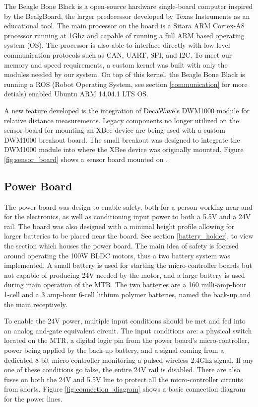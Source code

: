 The Beagle Bone Black is a open-source hardware single-board computer inspired by the BealgBoard, the larger predecessor developed by Texas Instruments as an educational tool.
The main processor on the board is a Sitara ARM Cortex-A8 processor running at 1Ghz and capable of running a full ARM based operating system (OS).
The processor is also able to interface directly with low level communication protocols such as CAN, UART, SPI, and I2C.
To meet our memory and speed requirements, a custom kernel was built with only the modules needed by our system.
On top of this kernel, the Beagle Bone Black is running a ROS (Robot Operating System, see section \ref{communication} for more detials) enabled Ubuntu ARM 14.04.1 LTS OS.

A new feature developed is the integration of DecaWave's DWM1000 module for relative distance measurements.
Legacy components no longer utilized on the sensor board for mounting an XBee device are being used with a custom DWM1000 breakout board.
The small breakout was designed to integrate the DWM1000 module into where the XBee device was originally mounted.
Figure \ref{fig:sensor_board} shows a sensor board mounted on \SB{}.

\subsection{Power Board}
\label{power_board}
The power board was design to enable safety, both for a person working near \SB{} and for the electronics, as well as conditioning input power to both a 5.5V and a 24V rail.
The board was also designed with a minimal height profile allowing for larger batteries to be placed near the board.
See section \ref{battery_holder}, to view the section which houses the power board.
The main idea of safety is focused around operating the 100W BLDC motors, thus a two battery system was implemented.
A small battery is used for starting the micro-controller boards but not capable of producing 24V needed by the motor, and a large battery is used during main operation of the MTR.
The two batteries are a 160 milli-amp-hour 1-cell and a 3 amp-hour 6-cell lithium polymer batteries, named the back-up and the main receptively.

To enable the 24V power, multiple input conditions should be met and fed into an analog and-gate equivalent circuit.
The input conditions are: a physical switch located on the MTR, a digital logic pin from the power board's micro-controller, power being applied by the back-up battery, and a signal coming from a dedicated 8-bit micro-controller monitoring a pulsed wireless 2.4Ghz signal.
If any one of these conditions go false, the entire 24V rail is disabled.
There are also fuses on both the 24V and 5.5V line to protect all the micro-controller circuits from shorts.
Figure \ref{fig:connection_diagram} shows a basic connection diagram for the power lines.

